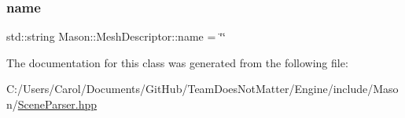 \hypertarget{class_mason_1_1_mesh_descriptor_a75515c41cf63390da23028110fb450dd}{}\label{class_mason_1_1_mesh_descriptor_a75515c41cf63390da23028110fb450dd} 
\subsubsection{\texorpdfstring{name}{name}}
{\footnotesize\ttfamily std\+::string Mason\+::\+Mesh\+Descriptor\+::name = \char`\"{}\char`\"{}}



The documentation for this class was generated from the following file\+:\begin{DoxyCompactItemize}
\item 
C\+:/\+Users/\+Carol/\+Documents/\+Git\+Hub/\+Team\+Does\+Not\+Matter/\+Engine/include/\+Mason/\hyperlink{_scene_parser_8hpp}{Scene\+Parser.\+hpp}\end{DoxyCompactItemize}
